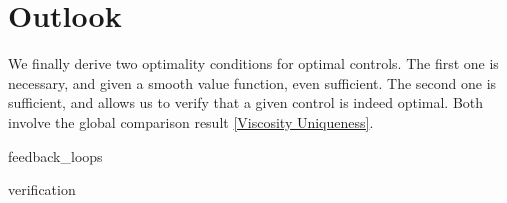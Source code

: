 \chapter{Outlook}

We finally derive two optimality conditions for optimal controls. The first one is necessary, and given a smooth value function, even sufficient. The second one is sufficient, and allows us to verify that a given control is indeed optimal. Both involve the global comparison result \ref{Viscosity Uniqueness}.

{feedback_loops}

{verification}
